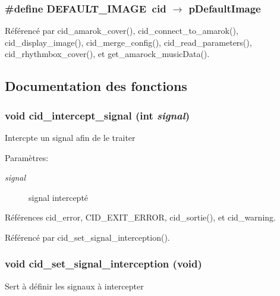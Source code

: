 \subsubsection{\setlength{\rightskip}{0pt plus 5cm}\#define DEFAULT\_\-IMAGE~{\bf cid} $\rightarrow$ pDefaultImage}\label{cid_8h_dd950b3d867b63874e6dd1f186326c2f}




Référencé par cid\_\-amarok\_\-cover(), cid\_\-connect\_\-to\_\-amarok(), cid\_\-display\_\-image(), cid\_\-merge\_\-config(), cid\_\-read\_\-parameters(), cid\_\-rhythmbox\_\-cover(), et get\_\-amarock\_\-musicData().

\subsection{Documentation des fonctions}
\subsubsection{\setlength{\rightskip}{0pt plus 5cm}void cid\_\-intercept\_\-signal (int {\em signal})}\label{cid_8h_21501416eb017004a4340f74799fcefa}


Intercpte un signal afin de le traiter \begin{Desc}
\item[Paramètres:]
\begin{description}
\item[{\em signal}]signal intercepté \end{description}
\end{Desc}


Références cid\_\-error, CID\_\-EXIT\_\-ERROR, cid\_\-sortie(), et cid\_\-warning.

Référencé par cid\_\-set\_\-signal\_\-interception().
\subsubsection{\setlength{\rightskip}{0pt plus 5cm}void cid\_\-set\_\-signal\_\-interception (void)}\label{cid_8h_0efde490c4fbc1830577e136134601c9}


Sert à définir les signaux à intercepter 

